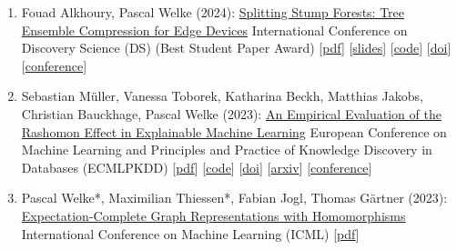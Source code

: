 \documentclass{scrartcl}
\begin{document}
\begin{enumerate}
{[\href{https://pwelke.de/publications/pluska2024logicaldistillationkrslides.pdf}{slides}]
[\href{https://github.com/lexpk/LogicalDistillationOfGNNs}{code}]
[\href{https://dx.doi.org/10.24963/kr.2024/86}{doi}]
[\href{https://arxiv.org/abs/2406.07126}{arxiv}]
[\href{https://kr.org/KR2024/}{conference}]
}
\item
\label{alkhoury2023splittingstumps}
Fouad Alkhoury, Pascal Welke (2024):\newline
\href{https://dx.doi.org/10.1007/978-3-031-78980-9_1}{Splitting Stump Forests: Tree Ensemble Compression for Edge Devices}\newline
International Conference on
Discovery Science (DS)\newline
(Best Student Paper Award)\newline
{\footnotesize
[\href{https://pwelke.de/publications/alkhoury2024splittingstumps.pdf}{pdf}]
[\href{https://pwelke.de/publications/alkhoury2024splittingstumpsslides.pdf}{slides}]
[\href{https://github.com/FouadAlkhoury/SplittingStumpsForests/}{code}]
[\href{https://dx.doi.org/10.1007/978-3-031-78980-9_1}{doi}]
[\href{http://ds2024.isti.cnr.it/}{conference}]
}
\item
\label{mueller2023ecml}
Sebastian Müller, Vanessa Toborek, Katharina Beckh, Matthias Jakobs, Christian Bauckhage, Pascal Welke (2023):\newline
\href{https://dx.doi.org/10.1007/978-3-031-43418-1_28}{An Empirical Evaluation of the Rashomon Effect in Explainable Machine Learning}\newline
European Conference on Machine Learning and Principles and Practice of Knowledge Discovery in Databases (ECMLPKDD)\newline
{\footnotesize
[\href{https://pwelke.de/publications/mueller2023rashomon.pdf}{pdf}]
[\href{https://github.com/lamarr-xai-group/RashomonEffect}{code}]
[\href{https://dx.doi.org/10.1007/978-3-031-43418-1_28}{doi}]
[\href{https://arxiv.org/abs/2306.15786}{arxiv}]
[\href{https://2023.ecmlpkdd.org}{conference}]
}
\item
\label{welke2023expectation}
Pascal Welke*, Maximilian Thiessen*, Fabian Jogl, Thomas Gärtner (2023):\newline
\href{https://proceedings.mlr.press/v202/welke23a.html}{Expectation-Complete Graph Representations with Homomorphisms}\newline
International Conference on Machine Learning (ICML)\newline
{\footnotesize
[\href{https://pwelke.de/publications/welkethiessen2023expectationcomplete.pdf}{pdf}]
}
\end{enumerate}
\end{document}
